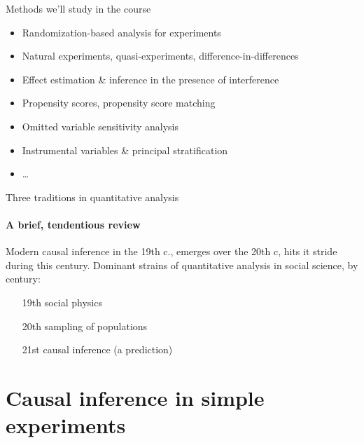 

\begin{frame}[label=whatWeWillCoverFr]{Methods we'll study in the course}
  \begin{itemize}
  \item Randomization-based analysis for experiments
  \item Natural experiments, quasi-experiments,
    difference-in-differences
  \item Effect estimation \& inference in the presence of interference
  \item Propensity scores, propensity score matching
  \item Omitted variable sensitivity analysis
  \item Instrumental variables \& principal stratification
  \item \ldots
  \end{itemize}
\end{frame}


\begin{frame}[handout:0]{Three traditions in quantitative analysis}
\framesubtitle{A brief, tendentious review}

Modern causal inference in the 19th c., emerges over the 20th c, hits
it stride during this century. Dominant strains of quantitative
analysis in social science, by century:

\begin{itemize}
\item[19th] social physics
\item[20th] sampling of populations
\item[21st] causal inference (a prediction)
\end{itemize}

  
\end{frame}

\section{Causal inference in simple experiments}

